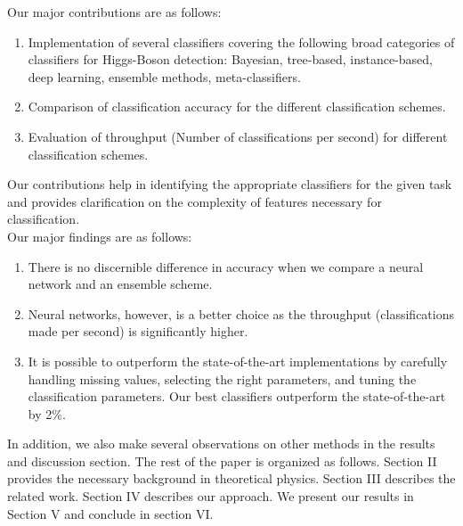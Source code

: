Our major contributions are as follows:
\begin{enumerate}
\item	Implementation of several classifiers covering the following broad categories of classifiers for Higgs-Boson detection: Bayesian, tree-based, instance-based, deep learning, ensemble methods, meta-classifiers.
\item	Comparison of classification accuracy for the different classification schemes.
\item	Evaluation of throughput (Number of classifications per second) for different classification schemes.
\end{enumerate}
Our contributions help in identifying the appropriate classifiers for the given task and provides clarification on the complexity of features necessary for classification. \\

Our major findings are as follows: 
\begin{enumerate}
\item	There is no discernible difference in accuracy when we compare a neural network and an ensemble scheme.
\item	Neural networks, however, is a better choice as the throughput (classifications made per second) is significantly higher.
\item	It is possible to outperform the state-of-the-art implementations by carefully handling missing values, selecting the right parameters, and tuning the classification parameters. Our best classifiers outperform the state-of-the-art by 2\%.
\end{enumerate}

In addition, we also make several observations on other methods in the results and discussion section. The rest of the paper is organized as follows. Section II provides the necessary background in theoretical physics. Section III describes the related work. Section IV describes our approach. We present our results in Section V and conclude in section VI.

